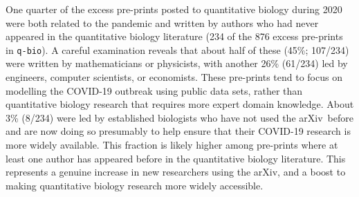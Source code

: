 \documentclass[]{rsos}%
\newcommand{\arxiv}{arXiv}
\begin{document}
One quarter of the excess pre-prints posted to quantitative biology during 2020 were both related to the pandemic and written by authors who had never appeared in the quantitative biology literature (234 of the 876 excess pre-prints in \texttt{q-bio}). A careful examination reveals that about half of these (45\%; 107/234) were written by mathematicians or physicists, with another 26\% (61/234) led by engineers, computer scientists, or economists. These pre-prints tend to focus on modelling the COVID-19 outbreak using public data sets, rather than quantitative biology research that requires more expert domain knowledge. About 3\% (8/234) were led by established biologists who have not used the \arxiv\ before and are now doing so presumably to help ensure that their COVID-19 research is more widely available. This fraction is likely higher among pre-prints where at least one author has appeared before in the quantitative biology literature. This represents a genuine increase in new researchers using the \arxiv, and a boost to making quantitative biology research more widely accessible. 










\end{document}
